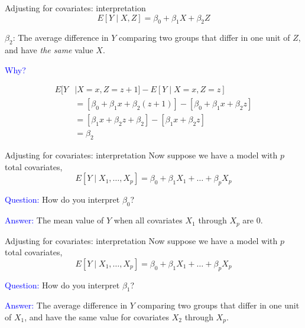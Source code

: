 \documentclass[10pt,t]{beamer}
\begin{document}
\begin{frame}{Adjusting for covariates: interpretation}
$$
E[Y \mid X, Z] = \beta_0 + \beta_1 X + \beta_2 Z
$$

\vspace{0.3cm}

$\beta_2$: The average difference in $Y$ comparing two groups that differ in one unit of $Z$, and have \textit{the same} value $X$.

\vspace{0.3cm}

\textcolor{blue}{Why?} \pause 

\begin{align*}
E[Y & \mid X = x, Z = z + 1] - E[Y \mid X = x, Z = z] \\
& = [\beta_0 + \beta_1 x + \beta_2 (z + 1)] - [\beta_0 + \beta_1x + \beta_2 z] \\
& = [\beta_1 x + \beta_2 z + \beta_2] - [\beta_1 x + \beta_2 z] \\
& = \beta_2
\end{align*}

\end{frame}

\begin{frame}{Adjusting for covariates: interpretation}
Now suppose we have a model with $p$ total covariates,
$$
E[Y \mid X_1, \dots, X_p] = \beta_0 + \beta_1 X_1 + \dots + \beta_p X_p
$$

\textcolor{blue}{Question:} How do you interpret $\beta_0$? \pause

\vspace{0.3cm}

\textcolor{blue}{Answer:} The mean value of $Y$ when all covariates $X_1$ through $X_p$ are $0$.
\end{frame}

\begin{frame}{Adjusting for covariates: interpretation}
Now suppose we have a model with $p$ total covariates,
$$
E[Y \mid X_1, \dots, X_p] = \beta_0 + \beta_1 X_1 + \dots + \beta_p X_p
$$

\textcolor{blue}{Question:} How do you interpret $\beta_1$? \pause

\vspace{0.3cm}

\textcolor{blue}{Answer:} The average difference in $Y$ comparing two groups that differ in one unit of $X_1$, and have the same value for covariates $X_2$ through $X_p$.
\end{frame}
\end{document}
